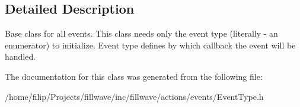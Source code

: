 \subsection{Detailed Description}
Base class for all events. This class needs only the event type (literally -\/ an enumerator) to initialize. Event type defines by which callback the event will be handled. 

The documentation for this class was generated from the following file\+:\begin{DoxyCompactItemize}
\item 
/home/filip/\+Projects/fillwave/inc/fillwave/actions/events/Event\+Type.\+h\end{DoxyCompactItemize}
